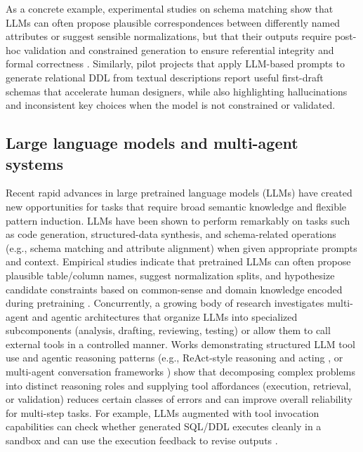 As a concrete example, experimental studies on schema matching show that LLMs can often propose plausible correspondences between differently named attributes or suggest sensible normalizations, but that their outputs require post-hoc validation and constrained generation to ensure referential integrity and formal correctness \cite{parciak2024}. Similarly, pilot projects that apply LLM-based prompts to generate relational DDL from textual descriptions report useful first-draft schemas that accelerate human designers, while also highlighting hallucinations and inconsistent key choices when the model is not constrained or validated.


\subsection{Large language models and multi-agent systems}
\label{sec:llm-agents}

Recent rapid advances in large pretrained language models (LLMs) have created new opportunities for tasks that require broad semantic knowledge and flexible pattern induction. LLMs have been shown to perform remarkably on tasks such as code generation, structured-data synthesis, and schema-related operations (e.g., schema matching and attribute alignment) when given appropriate prompts and context. Empirical studies indicate that pretrained LLMs can often propose plausible table/column names, suggest normalization splits, and hypothesize candidate constraints based on common-sense and domain knowledge encoded during pretraining \cite{parciak2024, zhou2024llmstructured}. Concurrently, a growing body of research investigates multi-agent and agentic architectures that organize LLMs into specialized subcomponents (analysis, drafting, reviewing, testing) or allow them to call external tools in a controlled manner. Works demonstrating structured LLM tool use and agentic reasoning patterns (e.g., ReAct-style reasoning and acting \cite{yao22}, or multi-agent conversation frameworks \cite{autogen}) show that decomposing complex problems into distinct reasoning roles and supplying tool affordances (execution, retrieval, or validation) reduces certain classes of errors and can improve overall reliability for multi-step tasks. For example, LLMs augmented with tool invocation capabilities can check whether generated SQL/DDL executes cleanly in a sandbox and can use the execution feedback to revise outputs \cite{schick23, wu2023hugginggpt}.

